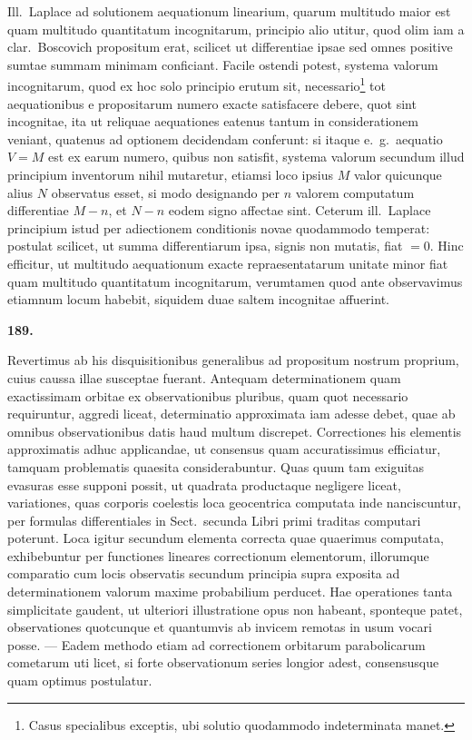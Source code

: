 \documentclass[11pt,a4paper]{article}
\begin{document}
Ill.\ Laplace ad solutionem aequationum linearium, quarum multitudo maior est quam multitudo quantitatum incognitarum, principio alio utitur, quod olim iam a clar.\ Boscovich propositum erat, scilicet ut differentiae ipsae sed omnes positive sumtae summam minimam conficiant. Facile ostendi potest, systema valorum incognitarum, quod ex hoc solo principio erutum sit, necessario\footnote{Casus specialibus exceptis, ubi solutio quodammodo indeterminata manet.} tot aequationibus e propositarum numero exacte satisfacere debere, quot sint incognitae, ita ut reliquae aequationes eatenus tantum in considerationem veniant, quatenus ad optionem decidendam conferunt: si itaque e.~g.\ aequatio $V = M$ est ex earum numero, quibus non satisfit, systema valorum secundum illud principium inventorum nihil mutaretur, etiamsi loco ipsius $M$ valor quicunque alius $N$ observatus esset, si modo designando per $n$ valorem computatum differentiae $M-n$, et $N-n$ eodem signo affectae sint. Ceterum ill.\ Laplace principium istud per adiectionem conditionis novae quodammodo temperat: postulat scilicet, ut summa differentiarum ipsa, signis non mutatis, fiat $= 0$. Hinc efficitur, ut multitudo aequationum exacte repraesentatarum unitate minor fiat quam multitudo quantitatum incognitarum, verumtamen quod ante observavimus etiamnum locum habebit, siquidem duae saltem incognitae affuerint.

\newpage
\setcounter{page}{260}

\noindent\textbf{189.}

Revertimus ab his disquisitionibus generalibus ad propositum nostrum proprium, cuius caussa illae susceptae fuerant. Antequam determinationem quam exactissimam orbitae ex observationibus pluribus, quam quot necessario requiruntur, aggredi liceat, determinatio approximata iam adesse debet, quae ab omnibus observationibus datis haud multum discrepet. Correctiones his elementis approximatis adhuc applicandae, ut consensus quam accuratissimus efficiatur, tamquam problematis quaesita considerabuntur. Quas quum tam exiguitas evasuras esse supponi possit, ut quadrata productaque negligere liceat, variationes, quas corporis coelestis loca geocentrica computata inde nanciscuntur, per formulas differentiales in Sect.\ secunda Libri primi traditas computari poterunt. Loca igitur secundum elementa correcta quae quaerimus computata, exhibebuntur per functiones lineares correctionum elementorum, illorumque comparatio cum locis observatis secundum principia supra exposita ad determinationem valorum maxime probabilium perducet. Hae operationes tanta simplicitate gaudent, ut ulteriori illustratione opus non habeant, sponteque patet, observationes quotcunque et quantumvis ab invicem remotas in usum vocari posse. --- Eadem methodo etiam ad correctionem orbitarum parabolicarum cometarum uti licet, si forte observationum series longior adest, consensusque quam optimus postulatur.
\end{document}
